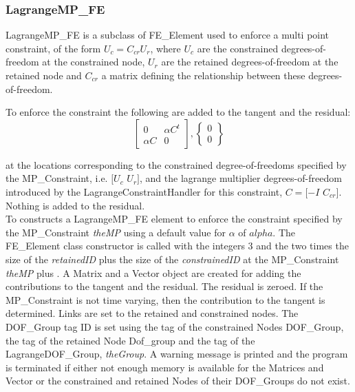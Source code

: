 \subsubsection{LagrangeMP\_FE}
LagrangeMP\_FE is a subclass of FE\_Element used to enforce a
multi point constraint, of the form $U_c = C_{cr} U_r$, where $U_c$ are
the constrained degrees-of-freedom at the constrained node, $U_r$ are
the retained degrees-of-freedom at the retained node and $C_{cr}$ a
matrix defining the relationship between these degrees-of-freedom. 

To enforce the constraint the following are added to the tangent and
the residual:
\[ \left[ \begin{array}{cc} 0 & \alpha C^t \\ \alpha C & 0 \end{array}
\right] ,
\left\{ \begin{array}{c} 0 \\ 0 \end{array} \right\} \]

\noindent at the locations
corresponding to the constrained degree-of-freedoms specified by the
MP\_Constraint, i.e. $[U_c$ $U_r]$, and the lagrange multiplier
degrees-of-freedom introduced by the LagrangeConstraintHandler for
this constraint, $C = [-I$ $ C_{cr}]$. Nothing is added to the residual. \\  


To constructs a LagrangeMP\_FE element to enforce the constraint
specified by the MP\_Constraint {\em theMP} using a default value for
$\alpha$ of $alpha$. The FE\_Element class constructor is called with
the integers $3$ and the two times the size of the {\em retainedID}
plus the size of the {\em constrainedID} at the MP\_Constraint {\em
theMP} plus . A Matrix and a Vector object are created for adding the
contributions to the tangent and the residual. The residual is
zeroed. If the MP\_Constraint is not time varying, then the contribution to the
tangent is determined. Links are set to the retained and constrained
nodes. The DOF\_Group tag ID is set using the tag of the constrained
Nodes DOF\_Group, the tag of the retained Node Dof\_group and the tag
of the LagrangeDOF\_Group, {\em theGroup}. A warning message is printed and 
the program is terminated if either not enough memory is available for
the Matrices and Vector or the constrained and retained Nodes of their
DOF\_Groups do not exist. \\




